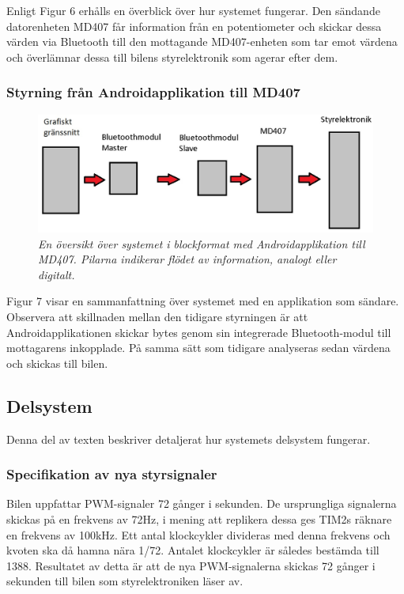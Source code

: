 \documentclass[a4paper]{article}
\begin{document}
Enligt Figur 6 erhålls en överblick över hur systemet fungerar. Den sändande datorenheten MD407 får information från en potentiometer och skickar dessa värden via Bluetooth till den mottagande MD407-enheten som tar emot värdena och överlämnar dessa till bilens styrelektronik som agerar efter dem.

\subsubsection{Styrning från Androidapplikation till MD407}
\begin{figure}[H]
\includegraphics[width=\textwidth]{systemoversiktAndroid.jpg}
\centering
\caption{\it En översikt över systemet i blockformat med Androidapplikation till MD407. Pilarna indikerar flödet av information, analogt eller digitalt.}
\end{figure} 

Figur 7 visar en sammanfattning över systemet med en applikation som sändare. Observera att skillnaden mellan den tidigare styrningen är att Androidapplikationen skickar bytes genom sin integrerade Bluetooth-modul till mottagarens inkopplade. På samma sätt som tidigare analyseras sedan värdena och skickas till bilen.


\subsection{Delsystem}
Denna del av texten beskriver detaljerat hur systemets delsystem fungerar.

\subsubsection{Specifikation av nya styrsignaler}
Bilen uppfattar PWM-signaler 72 gånger i sekunden. De ursprungliga signalerna skickas på en frekvens av 72Hz, i mening att replikera dessa ges TIM2s räknare en frekvens av 100kHz. Ett antal klockcykler divideras med denna frekvens och kvoten ska då hamna nära 1/72. Antalet klockcykler är således bestämda till 1388. Resultatet av detta är att de nya PWM-signalerna skickas 72 gånger i sekunden till bilen som styrelektroniken läser av.
\end{document}
